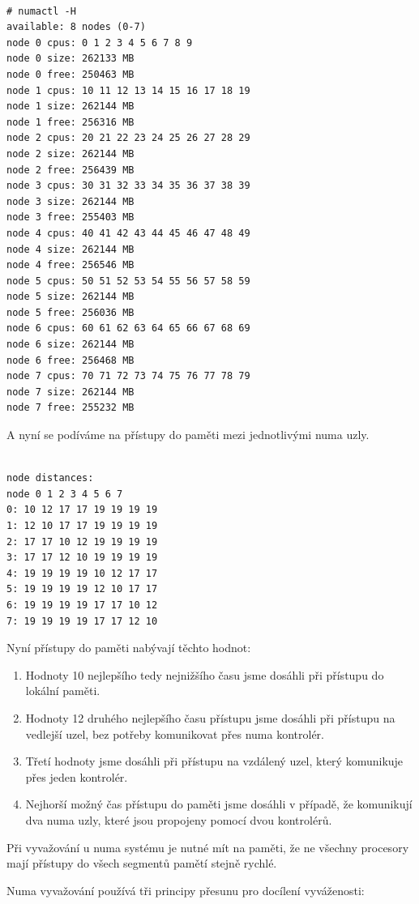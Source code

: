 \documentclass[
  field=ainfk,
  biblatex,
  glossaries,
  index
]{kidiplom}
\begin{document}
\begin{verbatim}

# numactl -H
available: 8 nodes (0-7)
node 0 cpus: 0 1 2 3 4 5 6 7 8 9
node 0 size: 262133 MB
node 0 free: 250463 MB
node 1 cpus: 10 11 12 13 14 15 16 17 18 19
node 1 size: 262144 MB
node 1 free: 256316 MB
node 2 cpus: 20 21 22 23 24 25 26 27 28 29
node 2 size: 262144 MB
node 2 free: 256439 MB
node 3 cpus: 30 31 32 33 34 35 36 37 38 39
node 3 size: 262144 MB
node 3 free: 255403 MB
node 4 cpus: 40 41 42 43 44 45 46 47 48 49
node 4 size: 262144 MB
node 4 free: 256546 MB
node 5 cpus: 50 51 52 53 54 55 56 57 58 59
node 5 size: 262144 MB
node 5 free: 256036 MB
node 6 cpus: 60 61 62 63 64 65 66 67 68 69
node 6 size: 262144 MB
node 6 free: 256468 MB
node 7 cpus: 70 71 72 73 74 75 76 77 78 79
node 7 size: 262144 MB
node 7 free: 255232 MB

\end{verbatim}

\newpage
\noindent
A nyní se podíváme na přístupy do paměti mezi jednotlivými numa uzly. 
\begin{verbatim}

node distances:
node 0 1 2 3 4 5 6 7
0: 10 12 17 17 19 19 19 19
1: 12 10 17 17 19 19 19 19
2: 17 17 10 12 19 19 19 19
3: 17 17 12 10 19 19 19 19
4: 19 19 19 19 10 12 17 17
5: 19 19 19 19 12 10 17 17
6: 19 19 19 19 17 17 10 12
7: 19 19 19 19 17 17 12 10

\end{verbatim}
\noindent
Nyní přístupy do paměti nabývají těchto hodnot:
\begin{enumerate}
\item Hodnoty 10 nejlepšího tedy nejnižšího času jsme dosáhli při přístupu do lokální paměti.
\item Hodnoty 12 druhého nejlepšího času přístupu jsme dosáhli při přístupu na vedlejší uzel, bez potřeby komunikovat přes numa kontrolér. 
\item Třetí hodnoty jsme dosáhli při přístupu na vzdálený uzel, který komunikuje přes jeden kontrolér.
\item Nejhorší možný čas přístupu do paměti jsme dosáhli v případě, že komunikují dva numa uzly, které jsou propojeny pomocí dvou kontrolérů.
\end{enumerate}

Při vyvažování u numa systému je nutné mít na paměti, že ne všechny procesory mají přístupy do všech segmentů pamětí stejně rychlé.

\noindent
Numa vyvažování používá tři principy přesunu pro docílení vyváženosti:
\end{document}
